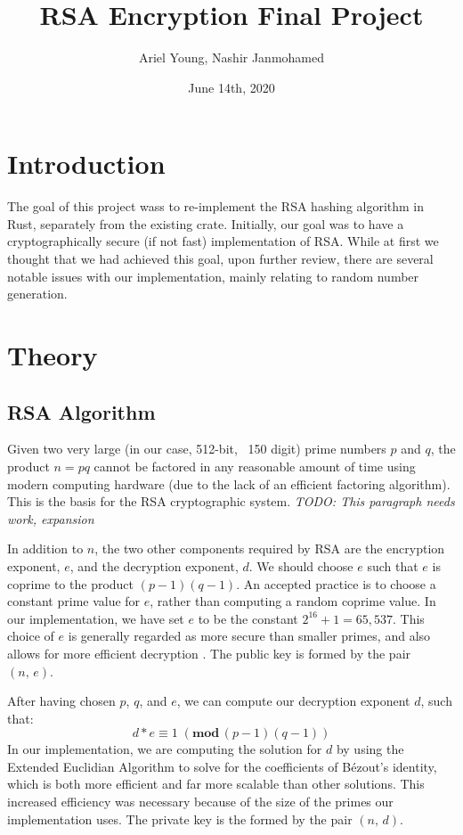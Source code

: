 \documentclass{article}
\title{RSA Encryption Final Project}
\author{Ariel Young, Nashir Janmohamed}
\date{June 14th, 2020}
\begin{document}
\maketitle
\tableofcontents

\section{Introduction}
The goal of this project wass to re-implement the RSA hashing algorithm in Rust, separately from the existing crate. Initially, our goal was to have a cryptographically secure (if not fast) implementation of RSA. While at first we thought that we had achieved this goal, upon further review, there are several notable issues with our implementation, mainly relating to random number generation.

\section{Theory}
\subsection{RSA Algorithm}
Given two very large (in our case, 512-bit, ~150 digit) prime numbers $p$ and $q$, the product $n = pq$ cannot be factored in any reasonable amount of time using modern computing hardware (due to the lack of an efficient factoring algorithm). This is the basis for the RSA cryptographic system. \textit{TODO: This paragraph needs work, expansion}

In addition to $n$, the two other components required by RSA are the encryption exponent, $e$, and the decryption exponent, $d$. We should choose $e$ such that $e$ is coprime to the product $(p - 1)(q - 1)$. An accepted practice is to choose a constant prime value for $e$, rather than computing a random coprime value. In our implementation, we have set $e$ to be the constant $2^{16} + 1 = 65,537$. This choice of $e$ is generally regarded as more secure than smaller primes, and also allows for more efficient decryption \cite{rsa_attacks}. The public key is formed by the pair $(n,\, e)$.

After having chosen $p$, $q$, and $e$, we can compute our decryption exponent $d$, such that: \[ d*e \equiv 1 \;(\textbf{mod}\,(p - 1)(q - 1)) \] In our implementation, we are computing the solution for $d$ by using the Extended Euclidian Algorithm to solve for the coefficients of Bézout's identity, which is both more efficient and far more scalable than other solutions. This increased efficiency was necessary because of the size of the primes our implementation uses. The private key is the formed by the pair $(n,\, d)$.
\end{document}
